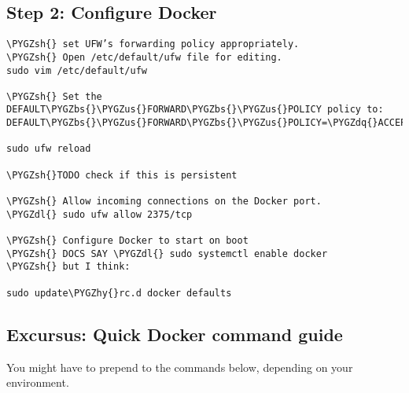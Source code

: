 \documentclass[letterpaper,10pt,english]{sphinxmanual}
\def\PYGZbs{\char`\\}
\def\PYGZus{\char`\_}
\def\PYGZsh{\char`\#}
\def\PYGZdl{\char`\$}
\def\PYGZhy{\char`\-}
\def\PYGZdq{\char`\"}
\begin{document}
\subsection{Step 2: Configure Docker}
\label{admin:step-2-configure-docker}
\begin{Verbatim}[commandchars=\\\{\}]
\PYGZsh{} set UFW’s forwarding policy appropriately.
\PYGZsh{} Open /etc/default/ufw file for editing.
sudo vim /etc/default/ufw

\PYGZsh{} Set the DEFAULT\PYGZbs{}\PYGZus{}FORWARD\PYGZbs{}\PYGZus{}POLICY policy to:
DEFAULT\PYGZbs{}\PYGZus{}FORWARD\PYGZbs{}\PYGZus{}POLICY=\PYGZdq{}ACCEPT\PYGZdq{}

sudo ufw reload

\PYGZsh{}TODO check if this is persistent

\PYGZsh{} Allow incoming connections on the Docker port.
\PYGZdl{} sudo ufw allow 2375/tcp

\PYGZsh{} Configure Docker to start on boot
\PYGZsh{} DOCS SAY \PYGZdl{} sudo systemctl enable docker
\PYGZsh{} but I think:

sudo update\PYGZhy{}rc.d docker defaults
\end{Verbatim}


\subsection{Excursus: Quick Docker command guide}
\label{admin:excursus-quick-docker-command-guide}
You might have to prepend  to the commands below, depending on your
environment.
\end{document}
